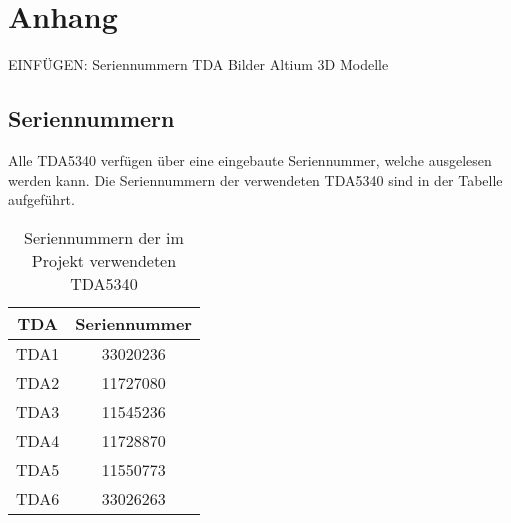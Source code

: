 \chapter{Anhang}
\label{sec:Anhang}
\pagestyle{scrheadings}
EINFÜGEN:
Seriennummern TDA
Bilder Altium
3D Modelle


\section{Seriennummern}
\label{app:Seriennummern}
Alle TDA5340 verfügen über eine eingebaute Seriennummer, welche ausgelesen werden kann. Die Seriennummern der verwendeten TDA5340 sind in der Tabelle aufgeführt.
\begin{table}[h]
\centering
\begin{tabular}{cc}
TDA & Seriennummer\\
\hline
TDA1 & 33020236\\
TDA2 & 11727080\\
TDA3& 11545236\\
TDA4& 11728870\\
TDA5& 11550773\\
TDA6& 33026263\\
\end{tabular}
\caption{Seriennummern der im Projekt verwendeten TDA5340 }
\label{default}
\end{table}%
